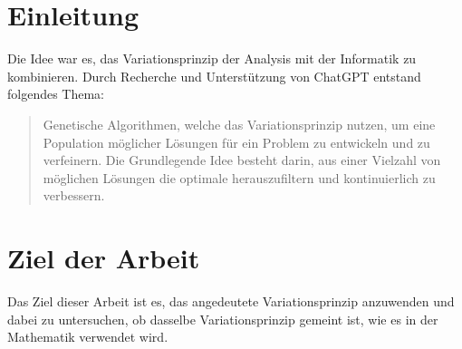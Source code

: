 %
%
%
%
\section{Einleitung
\label{buch:paper:section:introduction}}
Die Idee war es, das Variationsprinzip der Analysis mit der Informatik zu kombinieren. 
Durch Recherche und Unterstützung von ChatGPT entstand folgendes Thema:

\begin{quote}
    Genetische Algorithmen, welche das Variationsprinzip nutzen, um eine Population 
    möglicher Lösungen für ein Problem zu entwickeln und zu verfeinern. 
    Die Grundlegende Idee besteht darin, aus einer Vielzahl von möglichen Lösungen 
    die optimale herauszufiltern und kontinuierlich zu verbessern.
\end{quote}

\section{Ziel der Arbeit
\label{buch:paper:varalg:section:goal}} 
Das Ziel dieser Arbeit ist es, das angedeutete Variationsprinzip anzuwenden und dabei 
zu untersuchen, ob dasselbe Variationsprinzip gemeint ist, wie es in der Mathematik 
verwendet wird.
